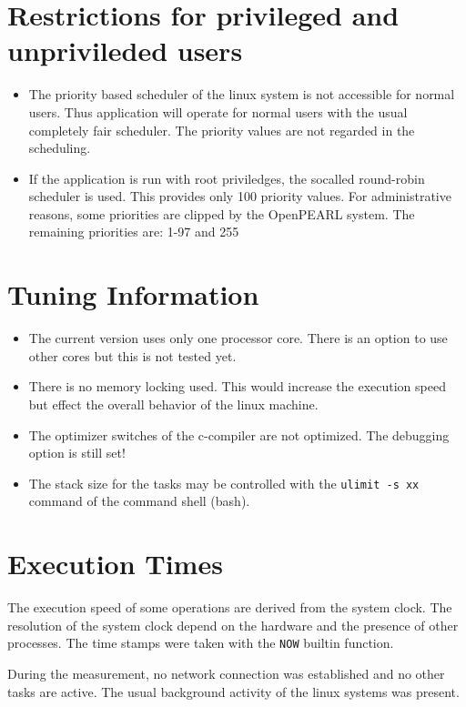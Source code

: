 \documentclass[10pt]{scrbook}
\begin{document}
\section{Restrictions for privileged and unprivileded users}
\begin{itemize}
\item The priority based scheduler of the linux system is not
   accessible for normal users. Thus application will operate for 
   normal users with
   the usual completely fair scheduler. The priority values are 
   not regarded in the scheduling.
\item If the application is run with root priviledges, the socalled 
  round-robin scheduler is used. This provides only 100 priority values.
  For administrative reasons, some priorities are clipped by the OpenPEARL
  system.
  The remaining priorities are: 1-97 and 255
\end{itemize}

\section{Tuning Information}
\begin{itemize}
\item The current version uses only one processor core.
     There is an option to use other cores but this is not tested yet.
\item There is no memory locking used.
     This would increase the execution speed but effect the overall
     behavior of the linux machine.
\item The optimizer switches of the c-compiler are not optimized.
   The debugging option is still set!
\item The stack size for the tasks may be controlled with the
   \texttt{ulimit -s xx} command of the command shell (bash).
\end{itemize}

\section{Execution Times}
The execution speed of some operations are derived from the system clock.
The resolution of the system clock depend on the hardware and the 
presence of other processes.
The time stamps were taken with the \texttt{NOW} builtin function.

During the measurement, no network connection was established and no
other tasks are active. The usual background activity of the linux
systems was present.
\end{document}

